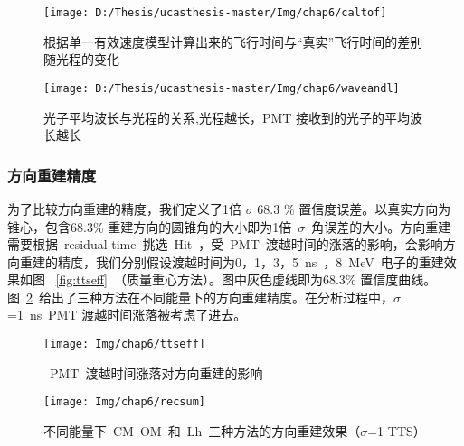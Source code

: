 \begin{figure}[!htbp]
\begin{minipage}[t]{0.48\linewidth}
  \centering
    \texttt{[image: D:/Thesis/ucasthesis-master/Img/chap6/caltof]}
    \caption{根据单一有效速度模型计算出来的飞行时间与``真实''飞行时间的差别随光程的变化}
    \label{fig:tofcal_1}
  \end{minipage}
    \quad\quad
  \begin{minipage}[t]{0.48\linewidth}
  \centering
    \texttt{[image: D:/Thesis/ucasthesis-master/Img/chap6/waveandl]}
    \caption{光子平均波长与光程的关系,光程越长，PMT 接收到的光子的平均波长越长}
    \label{fig:tofcal_2}
    \end{minipage}
\end{figure}


\subsubsection{方向重建精度}
为了比较方向重建的精度，我们定义了1倍 $\sigma$ 68.3 \% 置信度误差。以真实方向为锥心，包含68.3\% 重建方向的圆锥角的大小即为1倍~$\sigma$~角误差的大小。方向重建需要根据~residual time~挑选~Hit~，受~PMT~渡越时间的涨落的影响，会影响方向重建的精度，我们分别假设渡越时间为0，1，3，5~ns~，8~MeV~电子的重建效果如图
~\ref{fig:ttseff}~（质量重心方法）。图中灰色虚线即为68.3\% 置信度曲线。图~\ref{fig:recsum}~给出了三种方法在不同能量下的方向重建精度。在分析过程中，$\sigma$=1~ns~PMT 渡越时间涨落被考虑了进去。

\begin{figure}[!htbp]
\begin{minipage}[t]{0.48\linewidth}
  \centering
   \texttt{[image: Img/chap6/ttseff]}
    \caption{~PMT~渡越时间涨落对方向重建的影响}
  \label{fig:ttseff}
\end{minipage}
 \quad\quad
\begin{minipage}[t]{0.48\linewidth}
  \centering
   \texttt{[image: Img/chap6/recsum]}
    \caption{不同能量下~CM~OM~和~Lh~三种方法的方向重建效果（$\sigma$=1 TTS）}
  \label{fig:recsum}
\end{minipage}
\end{figure}
